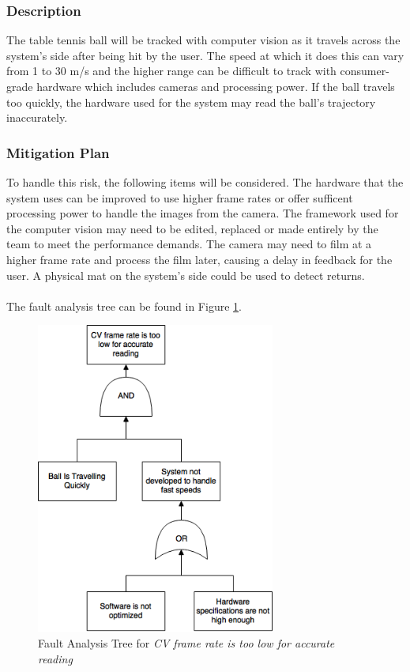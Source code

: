 \documentclass[11pt]{article}
\begin{document}
\subsubsection*{Description}
The table tennis ball will be tracked with computer vision as it travels across the system's side after being hit by the user. The speed at which it does this can vary from 1 to 30 m/s and the higher range can be difficult to track with consumer-grade hardware which includes cameras and processing power. If the ball travels too quickly, the hardware used for the system may read the ball's trajectory inaccurately.
\subsubsection*{Mitigation Plan}
To handle this risk, the following items will be considered. The hardware that the system uses can be improved to use higher frame rates or offer sufficent processing power to handle the images from the camera. The framework used for the computer vision may need to be edited, replaced or made entirely by the team to meet the performance demands. The camera may need to film at a higher frame rate and process the film later, causing a delay in feedback for the user. A physical mat on the system's side could be used to detect returns. \\ \\

The fault analysis tree can be found in Figure \ref{fig:ft-cv}.

\begin{figure}[H]
   \centering
   \includegraphics[width=0.7\textwidth]{img/ft-cv.png} %
   \caption{Fault Analysis Tree for \textit{CV frame rate is too low for accurate reading}}
   \label{fig:ft-cv}
\end{figure}
\end{document}
